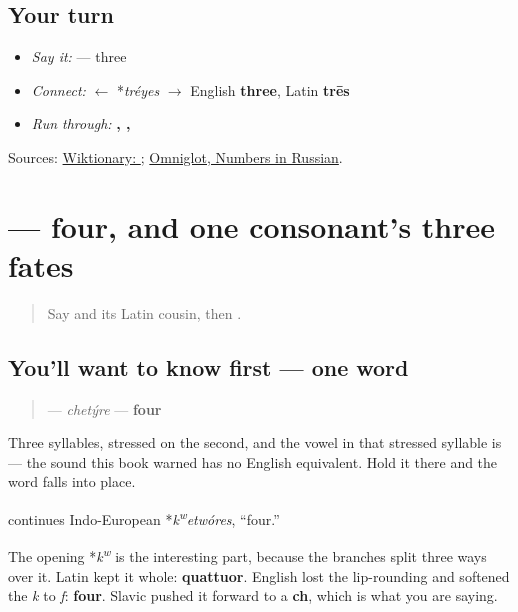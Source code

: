 \subsection*{Your turn}
\begin{itemize}
\raggedright
  \item \emph{Say it:} \textbf{} — three
  \item \emph{Connect:} \textbf{} $\leftarrow$ *\emph{tréyes} $\to$ English \textbf{three}, Latin \textbf{trēs}
  \item \emph{Run through:} \textbf{, , }
\end{itemize}

\begin{tcolorbox}[breakable,colback=teal!4,colframe=teal!35!black,title={Before you move on}]
Sources: \href{https://en.wiktionary.org/wiki/\%D1\%82\%D1\%80\%D0\%B8}{Wiktionary: }; \href{https://www.omniglot.com/language/numbers/russian.htm}{Omniglot, Numbers in Russian}.
\end{tcolorbox}
\section[\texorpdfstring{\ru{четыре} (chetýre)}{четыре (chetýre)}]{ — four, and one consonant's three fates}

\label{lesson:RU-C23-chetyre}



\begin{quote}
Say \textbf{} and its Latin cousin, then \textbf{}.
\end{quote}

\subsection*{You'll want to know first — one word}
\begin{quote}
\textbf{} — \emph{chetýre} — \textbf{four}
\end{quote}

Three syllables, stressed on the second, and the vowel in that stressed syllable is \textbf{} — the sound this book warned has no English equivalent. Hold it there and the word falls into place.

\begin{cousinweb}
\textbf{} continues Indo-European *\emph{k\textsuperscript{w}etwóres}, \textquotedblleft{}four.\textquotedblright{}

The opening *\emph{k\textsuperscript{w}} is the interesting part, because the branches split three ways over it. Latin kept it whole: \textbf{quattuor}. English lost the lip-rounding and softened the \emph{k} to \emph{f}: \textbf{four}. Slavic pushed it forward to a \textbf{ch}, which is what you are saying.
\end{cousinweb}


